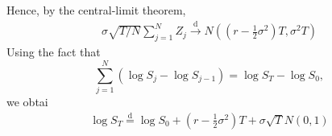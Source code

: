 \documentclass[12pt]{article}
\theoremstyle{plain}
\theoremstyle{definition}
\theoremstyle{remark}
\numberwithin{equation}{section}  %
\begin{document}
Hence, by the central-limit theorem,
\begin{equation*}
\begin{split}
	\sigma \sqrt{T/N} \sum_{j=1}^{N} Z_{j} \xrightarrow{\text{d}}
	N (\left( r - \frac{1}{2} \sigma^{2} \right)T, \sigma^{2} T) 
\end{split}
\end{equation*}
Using the fact that 
\begin{equation*}
	\sum_{j=1}^{N} (\log S_{j} - \log S_{j-1}) = \log S_{T} - \log S_{0},
\end{equation*}
we obtai
\begin{equation*}
\begin{split}
	\log S_{T} \overset{\text{d}}{=} \log S_{0} + (r -
	\frac{1}{2}\sigma^{2})T
	+ \sigma \sqrt{T} N(0,1)
\end{split}
\end{equation*}
\end{document}
